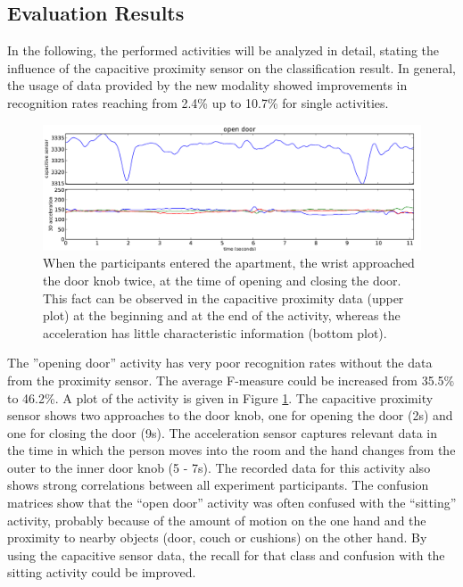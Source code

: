\documentclass[runningheads,a4paper]{llncs}
\begin{document}
\subsection{Evaluation Results}
\label{sect:evaluation}

In the following, the performed activities will be analyzed in detail, stating the influence of the capacitive proximity sensor on the classification result. In general, the usage of data provided by the new modality showed improvements in recognition rates reaching from 2.4\% up to 10.7\% for single activities.

\begin{figure}[h]
	\centering
		\includegraphics[width=1.00\textwidth]{../Auswertung/images/tobias_1.pdf}
	\caption{When the participants entered the apartment, the wrist approached the door knob twice, at the time of opening and closing the door. This fact can be observed in the capacitive proximity data (upper plot) at the beginning and at the end of the activity, whereas the acceleration has little characteristic information (bottom plot).}
	\label{fig:opendoor}
\end{figure}

The ''opening door'' activity has very poor recognition rates without the data from the proximity sensor. The average F-measure could be increased from 35.5\% to 46.2\%. A plot of the activity is given in Figure \ref{fig:opendoor}. The capacitive proximity sensor shows two approaches to the door knob, one for opening the door (2s) and one for closing the door (9s). The acceleration sensor captures relevant data in the time in which the person moves into the room and the hand changes from the outer to the inner door knob (5 - 7s). The recorded data for this activity also shows strong correlations between all experiment participants. The confusion matrices show that the ``open door'' activity was often confused with the ``sitting'' activity, probably because of the amount of motion on the one hand and the proximity to nearby objects (door, couch or cushions) on the other hand. By using the capacitive sensor data, the recall for that class and confusion with the sitting activity could be improved. 
\end{document}
